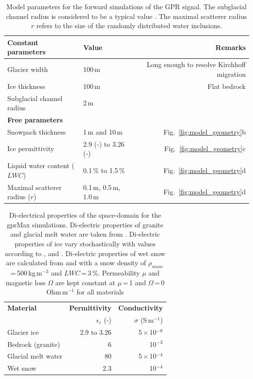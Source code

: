 \begin{table}
    \centering
\caption{Model parameters for the forward simulations of the GPR signal. The subglacial channel radius is considered to be a typical value \citep{Fountain&Walder1998, Cuffey&Paterson2010}. The maximal scatterer radius $r$ refers to the size of the randomly distributed water inclusions.}
    \begin{tabular}{l l r}
         \hline
\textbf{Constant parameters}  & \textbf{Value} & \textbf{Remarks} \\
\hline
Glacier width & 100\,m & Long enough to resolve Kirchhoff migration\\
Ice thickness & 100\,m & Flat bedrock \\
Subglacial channel radius & 2\,m & \\
\hline
\textbf{Free parameters}  &  &  \\
\hline
Snowpack thickness & 1\,m and 10\,m & Fig.~\ref{fig:model_geometry}b\\
Ice permittivity & 2.9 (-) to 3.26 (-) & Fig.~\ref{fig:model_geometry}c\\
Liquid water content ($LWC$) & 0.1\,\% to 1.5\,\% & Fig.~\ref{fig:model_geometry}d \\
Maximal scatterer radius ($r$) & 0.1\,m, 0.5\,m, 1.0\,m & Fig.~\ref{fig:model_geometry}d\\
\hline
    \end{tabular}
\label{tab:simul_param}
\end{table}

\begin{table}
\centering
 \caption{Di-electrical properties of the space-domain for the gprMax simulations. Di-electric properties of granite and glacial melt water are taken from \cite{Plewes&Hubbard2001}. Di-electric properties of ice vary stochastically with values according to \cite{Jezek&al1978}, \cite{Johari&Charette1975} and \cite{ Plewes&Hubbard2001}. Di-electric properties of wet snow are calculated from \cite{Tiuri&al1984} and \cite{Granlund&al2010} with a snow density of $\rho_{snow}$\,=\,500\,kg\,m$^{-3}$ and $LWC$\,=\,3\,\%. Permeability $\mu$ and magnetic loss $\Omega$ are kept constant at $\mu$\,=\,1 and $\Omega$\,=\,0 Ohm\,m$^{-1}$ for all materials}
\begin{tabular}{l r r}
\hline
\textbf{Material} & \textbf{Permittivity}  & \textbf{Conductivity}\\
& $\epsilon_r$ (-)& $\sigma$ (S\,m$^{-1}$)\\
\hline
Glacier ice & 2.9 to 3.26 & 5\,$\times$\,10$^{-8}$\\
Bedrock (granite) & 6 & 10$^{-3}$\\
Glacial melt water & 80 & 5\,$\times$\,10$^{-4}$\\
Wet snow & 2.3 & 10$^{-4}$\\
\hline
    \end{tabular}
    \label{tab_material_properties}
\end{table}

